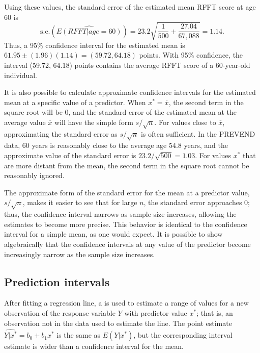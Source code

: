 Using these values, the standard error of the estimated mean RFFT score at age 60 is
\[\text{s.e.}(\widehat{E(RFFT|age = 60)}) = 23.2 \sqrt{\frac{1}{500} + \frac{27.04}{67,088}} = 1.14.\]
Thus, a 95\% confidence interval for the estimated mean is $61.95 \pm (1.96)(1.14) = (59.72, 64.18)$ points. With 95\% confidence, the interval (59.72, 64.18) points contains the average RFFT score of a 60-year-old individual.

It is also possible to calculate approximate confidence intervals for the estimated mean at a specific value of a predictor. When $x^* = \overline{x}$, the second term in the square root will be 0, and the standard error of the estimated mean at the average value $\overline{x}$ will have the simple form $s/\sqrt{n}$. For values close to $\overline{x}$, approximating the standard error as $s/\sqrt{n}$ is often sufficient.  In the PREVEND data, 60 years is reasonably close to the average age 54.8 years, and the approximate value of the standard error is $23.2/\sqrt{500} = 1.03$.  For values $x^*$ that are more distant from the mean, the second term in the square root cannot be reasonably ignored.

The approximate form of the standard error for the mean at a predictor value, $s/\sqrt{n}$, makes it easier to see that for large $n$, the standard error approaches 0; thus, the confidence interval narrows as sample size increases, allowing the estimates to become more precise. This behavior is identical to the confidence interval for a simple mean, as one would expect.  It is possible to show algebraically that the confidence intervals at any value of the predictor become increasingly narrow as the sample size increases.


\textD{\newpage}


\subsection{Prediction intervals}


After fitting a regression line, a  is used to estimate a range of values for a new observation of the response variable $Y$ with predictor value $x^*$; that is, an observation not in the data used to estimate the line. The point estimate $\widehat{Y|x^*} = b_0 + b_1x^*$ is the same as $\widehat{E(Y|x^*)}$, but the corresponding interval estimate is wider than a confidence interval for the mean.

